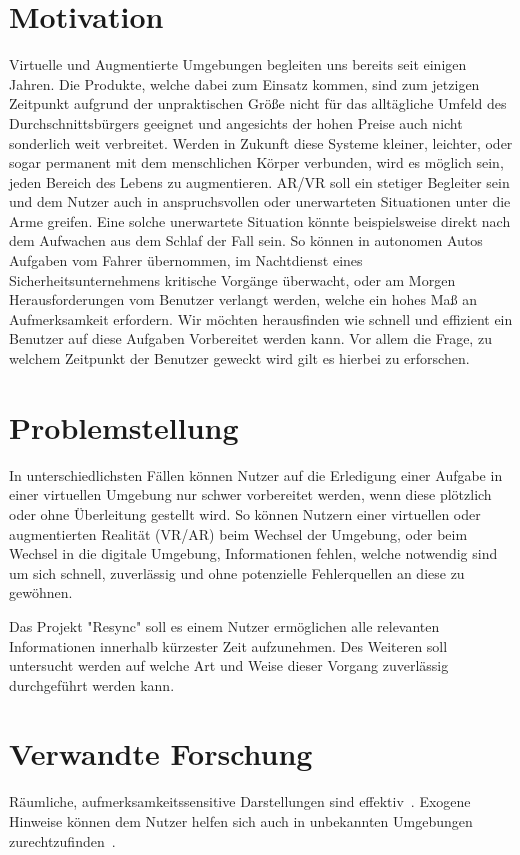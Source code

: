 \documentclass[a4paper, 11pt]{article}
\newcommand{\projectName}{Resync}
\begin{document}
\section*{Motivation}
Virtuelle und Augmentierte Umgebungen begleiten uns bereits seit einigen Jahren.  Die Produkte, welche dabei zum Einsatz kommen, sind zum jetzigen Zeitpunkt aufgrund der unpraktischen Größe nicht für das alltägliche Umfeld des Durchschnittsbürgers geeignet und angesichts der hohen Preise auch nicht sonderlich weit verbreitet.
Werden in Zukunft diese Systeme kleiner, leichter, oder sogar permanent mit dem menschlichen Körper verbunden, wird es möglich sein, jeden Bereich des Lebens zu augmentieren. AR/VR soll ein stetiger Begleiter sein und dem Nutzer auch in anspruchsvollen oder unerwarteten Situationen unter die Arme greifen. Eine solche unerwartete Situation könnte beispielsweise direkt nach dem Aufwachen aus dem Schlaf der Fall sein. So können in autonomen Autos Aufgaben vom Fahrer übernommen, im Nachtdienst eines Sicherheitsunternehmens kritische Vorgänge überwacht, oder am Morgen Herausforderungen vom Benutzer verlangt werden, welche ein hohes Maß an Aufmerksamkeit erfordern.
Wir möchten herausfinden wie schnell und effizient ein Benutzer auf diese Aufgaben Vorbereitet werden kann. Vor allem die Frage, zu welchem Zeitpunkt der Benutzer geweckt wird gilt es hierbei zu erforschen.

\section*{Problemstellung}
In unterschiedlichsten Fällen können Nutzer auf die Erledigung einer Aufgabe in einer virtuellen Umgebung nur schwer vorbereitet werden, wenn diese  plötzlich oder ohne Überleitung gestellt wird. So können Nutzern einer virtuellen oder augmentierten Realität (VR/AR) beim Wechsel der Umgebung, oder beim Wechsel in die digitale Umgebung, Informationen fehlen, welche notwendig sind um sich schnell, zuverlässig und ohne potenzielle Fehlerquellen an diese zu gewöhnen. 

Das Projekt "\projectName" soll es einem Nutzer ermöglichen alle relevanten Informationen innerhalb kürzester Zeit aufzunehmen. Des Weiteren soll untersucht werden auf welche Art und Weise dieser Vorgang zuverlässig durchgeführt werden kann.

\section*{Verwandte Forschung}
Räumliche, aufmerksamkeitssensitive Darstellungen sind effektiv~\cite{bonanni2005attention}. Exogene Hinweise können dem Nutzer helfen sich auch in unbekannten Umgebungen zurechtzufinden~\cite{bonanni2005attention}.
\end{document}
